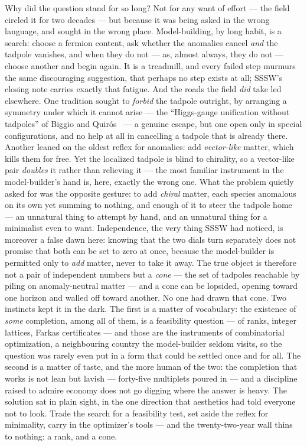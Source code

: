 \documentclass[11pt,a4paper]{article}
\begin{document}
Why did the question stand for so long? Not for any want of effort --- the field circled
it for two decades --- but because it was being asked in the wrong language, and sought in
the wrong place. Model-building, by long habit, is a search: choose a fermion content, ask
whether the anomalies cancel \emph{and} the tadpole vanishes, and when they do not --- as,
almost always, they do not --- choose another and begin again. It is a treadmill, and
every failed step murmurs the same discouraging suggestion, that perhaps no step exists at
all; SSSW's closing note carries exactly that fatigue. And the roads the field \emph{did}
take led elsewhere. One tradition sought to \emph{forbid} the tadpole outright, by
arranging a symmetry under which it cannot arise --- the ``Higgs-gauge unification without
tadpoles'' of Biggio and Quir\'os~\cite{BiggioQ} --- a genuine escape, but one open only in
special configurations, and no help at all in cancelling a tadpole that is already there.
Another leaned on the oldest reflex for anomalies: add \emph{vector-like} matter, which
kills them for free. Yet the localized tadpole is blind to chirality, so a vector-like
pair \emph{doubles} it rather than relieving it --- the most familiar instrument in the
model-builder's hand is, here, exactly the wrong one. What the problem quietly asked for
was the opposite gesture: to add \emph{chiral} matter, each species anomalous on its own
yet summing to nothing, and enough of it to steer the tadpole home --- an unnatural thing
to attempt by hand, and an unnatural thing for a minimalist even to want. Independence, the
very thing SSSW had noticed, is moreover a false dawn here: knowing that the two dials turn separately does not
promise that both can be set to zero at once, because the model-builder is permitted only
to \emph{add} matter, never to take it away. The true object is therefore not a pair of
independent numbers but a \emph{cone} --- the set of tadpoles reachable by piling on
anomaly-neutral matter --- and a cone can be lopsided, opening toward one horizon and
walled off toward another. No one had drawn that cone. Two instincts kept it in the dark.
The first is a matter of vocabulary: the existence of \emph{some} completion, among all of
them, is a feasibility question --- of ranks, integer lattices, Farkas certificates ---
and those are the instruments of combinatorial optimization, a neighbouring country the
model-builder seldom visits, so the question was rarely even put in a form that could be
settled once and for all. The second is a matter of taste, and the more human of the two:
the completion that works is not lean but lavish --- forty-five multiplets poured in ---
and a discipline raised to admire economy does not go digging where the answer is heavy.
The solution sat in plain sight, in the one direction that aesthetics had told everyone
not to look. Trade the search for a feasibility test, set aside the reflex for minimality,
carry in the optimizer's tools --- and the twenty-two-year wall thins to nothing: a rank,
and a cone.
\end{document}

